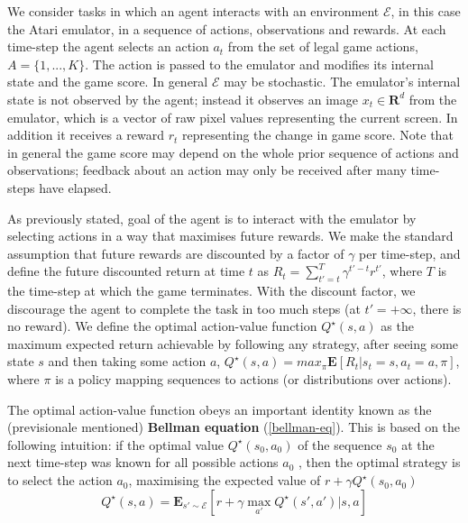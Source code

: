 \documentclass{article}
\begin{document}
We consider tasks in which an agent interacts with an environment $\mathcal{E}$, in this case the Atari emulator,
in a sequence of actions, observations and rewards. At each time-step the agent selects an action $a_{t}$ from the set of legal game actions, $A = \{1, . . . , K\}$. The action is passed to the emulator and
modifies its internal state and the game score. In general $\mathcal{E}$ may be stochastic. The emulator’s
internal state is not observed by the agent; instead it observes an image $x_t \in \mathbf{R}^d $ from the emulator,
which is a vector of raw pixel values representing the current screen. In addition it receives a reward
$r_t$ representing the change in game score. Note that in general the game score may depend on the
whole prior sequence of actions and observations; feedback about an action may only be received
after many time-steps have elapsed. %

As previously stated, goal of the agent is to interact with the emulator by selecting actions in a way that maximises
future rewards. We make the standard assumption that future rewards are discounted by a factor of $\gamma$ per time-step, and define the future discounted return at time $t$ as $R_t = \sum_{t'=t}^{T}\gamma^{t'-t}r^{t'}$, where $T$
is the time-step at which the game terminates. With the discount factor, we discourage the agent to complete the task in too much steps (at $t'=+\infty$, there is no reward). We define the optimal action-value function $Q^\star(s, a)$ as the maximum expected return achievable by following any strategy, after seeing some state $s$ and then taking some action $a$, $Q^\star (s, a) = max_\pi \mathbf{E}[R_t |s_t = s, a_ t = a, \pi]$, where $\pi$ is a policy mapping sequences to actions (or distributions over actions).

The optimal action-value function obeys an important identity known as the (previsionale mentioned) \textbf{Bellman equation} (\ref{bellman-eq}). This is based on the following intuition: if the optimal value $Q^\star (s_0 , a_0 )$ of the sequence $s_0$ at the next
time-step was known for all possible actions $a_0$ , then the optimal strategy is to select the action $a_0$, maximising the expected value of $r + \gamma Q^\star (s_0, a_0)$
\begin{equation}
\label{bellman-eq}
	Q^\star (s,a) = \mathbf{E}_{s' \sim \mathcal{E}} [ r + \gamma \max_{a'} Q^\star(s', a') | s, a  ]
\end{equation}
\end{document}
